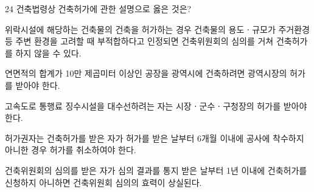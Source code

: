\begin{question}{24}
건축법령상 건축허가에 관한 설명으로 옳은 것은?
\begin{choices}
  \item 위락시설에 해당하는 건축물의 건축을 허가하는 경우 건축물의 용도ㆍ규모가 주거환경 등 주변 환경을 고려할 때 부적합하다고 인정되면 건축위원회의 심의를 거쳐 건축허가를 하지 않을 수 있다.
  \item 연면적의 합계가 10만 제곱미터 이상인 공장을 광역시에 건축하려면 광역시장의 허가를 받아야 한다.
  \item 고속도로 통행료 징수시설을 대수선하려는 자는 시장ㆍ군수ㆍ구청장의 허가를 받아야 한다.
  \item 허가권자는 건축허가를 받은 자가 허가를 받은 날부터 6개월 이내에 공사에 착수하지 아니한 경우 허가를 취소하여야 한다.
  \item 건축위원회의 심의를 받은 자가 심의 결과를 통지 받은 날부터 1년 이내에 건축허가를 신청하지 아니하면 건축위원회 심의의 효력이 상실된다.
\end{choices}
\end{question}
